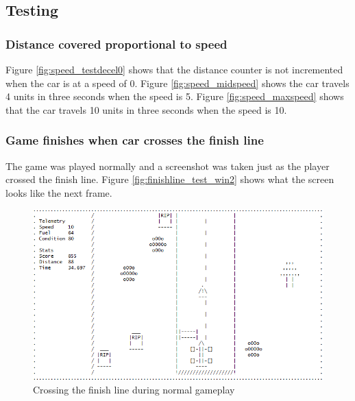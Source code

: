 \documentclass{article}
\begin{document}
\subsection*{Testing}
\subsubsection*{Distance covered proportional to speed}
Figure \ref{fig:speed_testdecel0} shows that the distance counter is not incremented when the car is at a speed of 0.
\newline
Figure \ref{fig:speed_midspeed} shows the car travels 4 units in three seconds when the speed is 5.
\newline
Figure \ref{fig:speed_maxspeed} shows that the car travels 10 units in three seconds when the speed is 10. 
\newpage
\subsubsection*{Game finishes when car crosses the finish line}
The game was played normally and a screenshot was taken just as the player crossed the finish line. Figure \ref{fig:finishline_test_win2} shows what the screen looks like the next frame.
\begin{figure}[!ht]
	\begin{center}
	\includegraphics[width=0.63\paperwidth]{images/finishline_test_win}
	\caption{Crossing the finish line during normal gameplay}
	\label{fig:finishline_test_win} 
	\end{center}
\end{figure}
\end{document}
